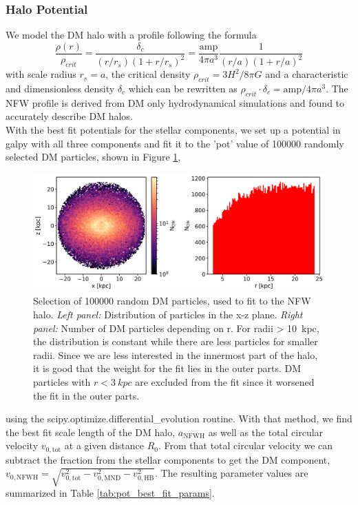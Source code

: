 \subsubsection{Halo Potential}\label{subsubsec:halo_pot}
We model the \ac{DM} halo with a \citet{NFWprofile} profile following the formula 
\begin{equation}
    \frac{\rho(r)}{\rho_{crit}} = \frac{\delta_c}{(r/r_s)(1+r/r_s)^2} = \frac{\mathrm{amp}}{4 \pi a^3}\frac{1}{(r/a)(1+r/a)^2}
\end{equation} with scale radius $r_s = a$, the critical density $\rho_{crit} = 3H^2 / 8\pi G $ and a characteristic and dimensionless density $\delta_c$ which can be rewritten as \(\rho_{crit}\cdot\delta_c = \mathrm{amp}/4\pi a^3 \). The \ac{NFW} profile is derived from \ac{DM} only hydrodynamical simulations and found to accurately describe \ac{DM} halos. 
\\With the best fit potentials for the stellar components, we set up a potential in galpy with all three components and fit it to the 'pot' value of 100000 randomly selected DM particles, shown in Figure \ref{fig:DM_part_selection},
\begin{figure}[htbp]
\captionsetup{format=plain}
    \centering
    \includegraphics[width=\textwidth]{plots/Auriga/DM_selected_part_dist_snap_127.png}
    \caption{Selection of 100000 random \ac{DM} particles, used to fit to the \ac{NFW} halo. \textit{Left panel:} Distribution of particles in the x-z plane. \textit{Right panel:} Number of \ac{DM} particles depending on r. For radii > \SI{10}{kpc}, the distribution is constant while there are less particles for smaller radii. Since we are less interested in the innermost part of the halo, it is good that the weight for the fit lies in the outer parts. \ac{DM} particles with $r < \SI{3}{kpc}$ are excluded from the fit since it worsened the fit in the outer parts.}
    \label{fig:DM_part_selection}
\end{figure}
using the scipy.optimize.differential\_evolution routine. With that method, we find the best fit scale length of the DM halo, $a_{\mathrm{NFWH}}$ as well as the total circular velocity $v_{0,\mathrm{tot}}$ at a given distance $R_0$. From that total circular velocity we can subtract the fraction from the stellar components to get the \ac{DM} component, $v_{0,\mathrm{NFWH}} = \sqrt{v_{0,\mathrm{tot}}^2 - v_{0, \mathrm{MND}}^2 - v_{0, \mathrm{HB}}^2}$. The resulting parameter values are summarized in Table \ref{tab:pot_best_fit_params}. 
